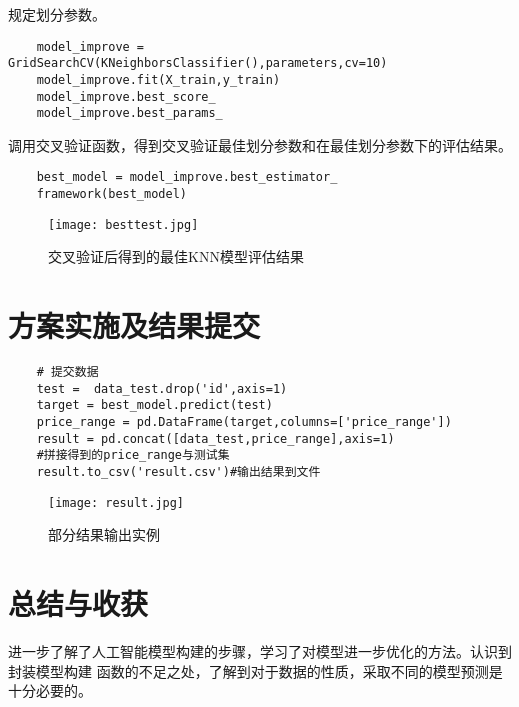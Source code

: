 \documentclass[AutoFakeBold]{LZUThesis}
\begin{document}
规定划分参数。
\begin{lstlisting}
    model_improve = GridSearchCV(KNeighborsClassifier(),parameters,cv=10)
    model_improve.fit(X_train,y_train) 
    model_improve.best_score_
    model_improve.best_params_
\end{lstlisting}

调用交叉验证函数，得到交叉验证最佳划分参数和在最佳划分参数下的评估结果。
\begin{lstlisting}
    best_model = model_improve.best_estimator_
    framework(best_model)
\end{lstlisting}
\begin{figure}[htbp]
    \centering
    \texttt{[image: besttest.jpg]}
    \caption{交叉验证后得到的最佳KNN模型评估结果}
\end{figure}
\chapter{方案实施及结果提交}
\begin{lstlisting}
    # 提交数据
    test =  data_test.drop('id',axis=1)
    target = best_model.predict(test)
    price_range = pd.DataFrame(target,columns=['price_range'])
    result = pd.concat([data_test,price_range],axis=1)
    #拼接得到的price_range与测试集
    result.to_csv('result.csv')#输出结果到文件
\end{lstlisting}
\begin{figure}[htbp]
    \centering
    \texttt{[image: result.jpg]}
    \caption{部分结果输出实例}
\end{figure}
\chapter{总结与收获}
进一步了解了人工智能模型构建的步骤，学习了对模型进一步优化的方法。认识到封装模型构建
函数的不足之处，了解到对于数据的性质，采取不同的模型预测是十分必要的。
\backmatter


\printbib
\nocite{*} %




\end{document}
